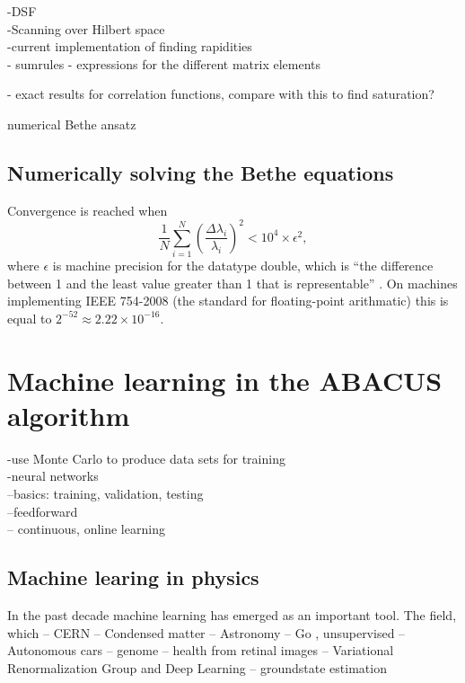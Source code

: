 \documentclass[11pt, a4paper,draft]{report} %
\begin{document}
-DSF\\
-Scanning over Hilbert space\\
-current implementation of finding rapidities\\
- sumrules
- expressions for the different matrix elements

- exact results for correlation functions\cite{Lang2017}, compare with this to find saturation?

numerical Bethe ansatz \cite{Gu2005}
\section{Numerically solving the Bethe equations}

Convergence is reached when \cite{Caux2009}
\begin{equation}
	\frac{1}{N}\sum_{i=1}^{N} \left(\frac{\Delta \lambda_i}{\lambda_i}\right)^2 < 10^4 \times \epsilon^2,
\end{equation}
where \(\epsilon\) is machine precision for the datatype double, which is ``the difference between 1 and the least value greater than 1 that is representable'' \cite{cppstandard2016}.
On machines implementing IEEE 754-2008 (the standard for floating-point arithmatic) \cite{ieeefp2008} this is equal to \({2^{-52} \approx 2.22 \times 10^{-16}}\).


\chapter{Machine learning in the ABACUS algorithm}


-use Monte Carlo to produce data sets for training\\
-neural networks\\
--basics: training, validation, testing\\
--feedforward\\
-- continuous, online learning

\section{Machine learing in physics}

In the past decade machine learning has emerged as an important tool.
The field, which 
-- CERN
-- Condensed matter\cite{Nieuwenburg2017}\cite{dunjko17_machin_learn_artif_intel_quant_domain}
-- Astronomy
-- Go \cite{Silver2017a}, unsupervised \cite{Silver2017}
-- Autonomous cars
-- genome \cite{Poplin2016}
-- health from retinal images \cite{poplin17_predic_cardiov_risk_factor_from}
--  Variational Renormalization Group and Deep Learning \cite{Mehta2014}
-- groundstate estimation \cite{cai17_approx_quant_many_body_wave}\cite{Saito2017}
\end{document}
